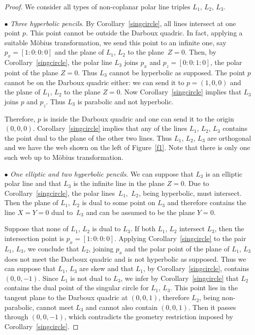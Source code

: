 \documentclass[pdftex]{sigma}
\numberwithin{equation}{section}
\begin{document}
\begin{proof}
We consider all types of non-coplanar polar line triples $L_1$, $L_2$, $L_3$.

$\bullet$ {\it Three hyperbolic pencils}. By Corollary~\ref{singcircle}, all lines intersect at one point $p$. This point cannot be outside the Darboux quadric. In fact, applying a suitable M\"obius transformation, we send this point to an infinite one, say $p_x=[1:0:0:0]$ and the plane of $L_1$, $L_2$ to the plane~${Z=0}$. Then, by Corollary~\ref{singcircle}, the polar line $L_3$ joins $p_x$ and $p_z=[0:0:1:0]$, the polar point of the plane $Z=0$. Thus $L_3$ cannot be hyperbolic as supposed. The point $p$ cannot be on the Darboux quadric either: we can send it to $p=(1,0,0)$ and the plane of $L_1$, $L_2$ to the plane $Z=0$. Now Corollary~\ref{singcircle} implies that $L_3$ joins $p$ and $p_z$. Thus $L_3$ is parabolic and not hyperbolic.

Therefore, $p$ is inside the Darboux quadric and one can send it to the origin $(0,0,0)$.
Corollary~\ref{singcircle} implies that any of the lines $L_1$, $L_2$, $L_3$ contains the point dual to the plane of the other two lines. Thus $L_1$, $L_2$, $L_3$ are orthogonal and
 we have the web shown on the left of Figure~\ref{f1}. Note that there is only one such web up to M\"obius transformation.

$\bullet$ {\it One elliptic and two hyperbolic pencils}.
We can suppose that $L_3$ is an elliptic polar line and that $L_3$ is the infinite line in the plane $Z=0$. Due to Corollary~\ref{singcircle}, the polar lines~$L_1$,~$L_2$, being hyperbolic, must intersect. Then the plane of $L_1$, $L_2$ is dual to some point on $L_3$ and therefore contains the line $X=Y=0$ dual to~$L_3$ and can be assumed to be the plane $Y=0$.

Suppose that none of $L_1$, $L_2$ is dual to $L_3$. If both $L_1$, $L_2$ intersect $L_3$, then the intersection point is $p_x=[1:0:0:0]$. Applying Corollary~\ref{singcircle} to the pair $L_1$, $L_3$, we conclude that $L_2$, joining $p_x$ and the polar point of the plane of $L_1$, $L_3$ does not meet the Darboux quadric and is not hyperbolic as supposed. Thus we can suppose that $L_1$, $L_3$ are skew and that $L_1$, by Corollary~\ref{singcircle}, contains $(0,0,-1)$. Since $L_1$ is not dual to $L_3$, we infer by Corollary~\ref{singcircle} that $L_2$ contains the dual point of the singular circle for $L_1$, $L_3$. This point lies in the tangent plane to the Darboux quadric at $(0,0,1)$, therefore $L_2$, being non-parabolic, cannot meet $L_3$ and cannot also contain $(0,0,1)$. Then it passes through $(0,0,-1)$, which contradicts the geometry restriction imposed by Corollary~\ref{singcircle}.


\end{proof}
\end{document}
